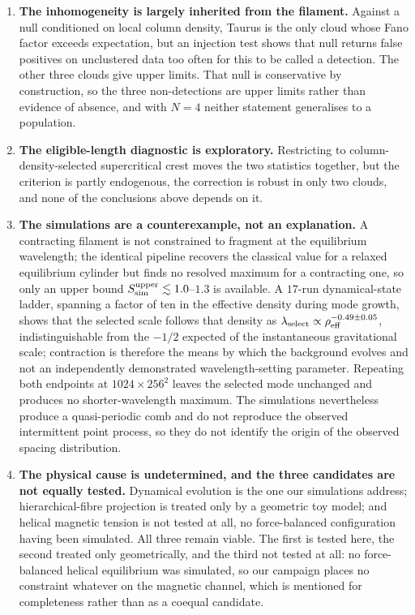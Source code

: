 \documentclass[usenatbib,twoside,twocolumn]{mnras}
\begin{document}
\begin{enumerate}
\item \textbf{The inhomogeneity is largely inherited from the filament.} Against a null conditioned on local column density, Taurus is the only cloud whose Fano factor exceeds expectation, but an injection test shows that null returns false positives on unclustered data too often for this to be called a detection. The other three clouds give upper limits. That null is conservative by construction, so the three non-detections are upper limits rather than evidence of absence, and with $N=4$ neither statement generalises to a population.
\item \textbf{The eligible-length diagnostic is exploratory.} Restricting to column-density-selected supercritical crest moves the two statistics together, but the criterion is partly endogenous, the correction is robust in only two clouds, and none of the conclusions above depends on it.
\item \textbf{The simulations are a counterexample, not an explanation.} A contracting filament is not constrained to fragment at the equilibrium wavelength; the identical pipeline recovers the classical value for a relaxed equilibrium cylinder but finds no resolved maximum for a contracting one, so only an upper bound $S_{\rm sim}^{\rm upper}\lesssim1.0$--$1.3$ is available. A $17$-run dynamical-state ladder, spanning a factor of ten in the effective density during mode growth, shows that the selected scale follows that density as $\lambda_{\rm select}\propto\rho_{\rm eff}^{-0.49\pm0.05}$, indistinguishable from the $-1/2$ expected of the instantaneous gravitational scale; contraction is therefore the means by which the background evolves  and not an independently demonstrated wavelength-setting parameter. Repeating both endpoints at $1024\times256^2$ leaves the selected mode unchanged and produces no shorter-wavelength maximum. The simulations nevertheless produce a quasi-periodic comb and do not reproduce the observed intermittent point process, so they do not identify the origin of the observed spacing distribution.
\item \textbf{The physical cause is undetermined, and the three candidates are not equally tested.} Dynamical evolution is the one our simulations address; hierarchical-fibre projection is treated only by a geometric toy model; and helical magnetic tension is not tested at all, no force-balanced configuration having been simulated. All three remain viable. The first is tested here, the second treated only geometrically, and the third not tested at all: no force-balanced helical equilibrium was simulated, so our campaign places no constraint whatever on the magnetic channel, which is mentioned for completeness rather than as a coequal candidate.
\end{enumerate}
\end{document}
